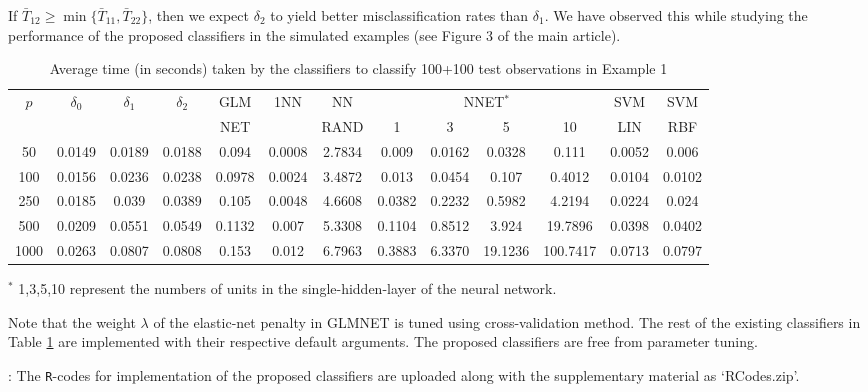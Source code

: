 \documentclass[twoside]{article}
\newcommand{\0}{\mathbf{0}}
\newcommand{\1}{\mathbf{1}}
\numberwithin{equation}{section}
\newcommand{\bl}{\color{blue}}
\begin{document}
If $\bar{T}_{12}\geq \min\{\bar{T}_{11},\bar{T}_{22}\}$, then we expect $\delta_2$ to yield better misclassification rates than $\delta_1$. We have observed this while studying the performance of the proposed classifiers in the simulated examples (see Figure 3 of the main article).
\begin{table}[H]
\caption{Average time (in seconds) taken by the classifiers to classify 100+100 test observations in Example 1}\label{tab4}
\centering
\begin{adjustbox}{width=\columnwidth,center}
\begin{tabular}{|c|c|c|c|c|c|c|cccc|c|c|}
\hline
$p$ &  $\delta_0$&$\delta_1$& $\delta_2$& GLM & 1NN & NN & \multicolumn{4}{c|}{NNET$^*$} & SVM & SVM\\
 & & & & NET & & RAND & 1&3&5&10 & LIN & RBF\\
\hline
50         & 0.0149  & 0.0189  & 0.0188  & 0.094  & 0.0008 & 2.7834   & 0.009    & 0.0162  & 0.0328   & 0.111    & 0.0052   & 0.006    \\ \hline
100        & 0.0156  & 0.0236  & 0.0238  & 0.0978 & 0.0024 & 3.4872   & 0.013    & 0.0454  & 0.107    & 0.4012   & 0.0104   & 0.0102   \\ \hline
250        & 0.0185  & 0.039   & 0.0389  & 0.105  & 0.0048 & 4.6608   & 0.0382   & 0.2232  & 0.5982   & 4.2194   & 0.0224   & 0.024    \\ \hline
500        & 0.0209  & 0.0551  & 0.0549  & 0.1132 & 0.007  & 5.3308   & 0.1104   & 0.8512  & 3.924    & 19.7896  & 0.0398   & 0.0402   \\ \hline
1000       & 0.0263  & 0.0807  & 0.0808  & 0.153  & 0.012  & 6.7963 & 0.3883 & 6.3370   & 19.1236 & 100.7417 & 0.0713 & 0.0797 \\ \hline
\end{tabular}
\end{adjustbox}
\end{table}
\vspace{-0.5cm}\footnotesize{$^*$ 1,3,5,10 represent the numbers of units in the single-hidden-layer of the neural network.}

Note that the weight $\lambda$ of the elastic-net penalty in GLMNET is tuned using cross-validation method. The rest of the existing classifiers in Table \ref{tab4} are implemented with their respective default arguments. The proposed classifiers are free from parameter tuning. \newline

: {\bl The {\tt R}-codes for implementation of the proposed classifiers are uploaded along with the supplementary material as `RCodes.zip'.}
\vfill

\end{document}
